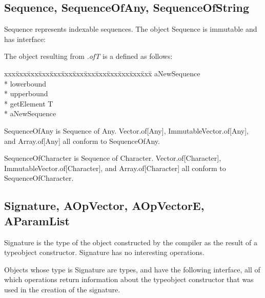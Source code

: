 \subsection{Sequence, SequenceOfAny, SequenceOfString}
Sequence represents indexable sequences.  The object Sequence is immutable
and has interface:
\begin{desc}
  \item[\kw{function} of\/\LB{}T \CO{} \tn{type}\/\RB{} \returns{}
  \/\LB{}aNewSequenceType \CO{} Type\/\RB{} \kw{forall} T]
\end{desc}

\noindent The object resulting from {\it {}.of\/\LB{}T\/\RB{}}
is a  defined as follows:

{\it\begin{minipage}{\textwidth}\begin{tabbing}
xxx\=xxx\=xxx\=xxx\=xxx\=xxx\=xxx\=xxx\=xxx\=xxx\=xxx\=xxx\=xxx\=\+\kill%
 aNewSequence\+\\*{}%
   lowerbound \returns{} \/\LB{}\/\RB{}\\*{}%
   upperbound \returns{} \/\LB{}\/\RB{}\\*{}%
   getElement\/\LB{}\/\RB{} \returns{} \/\LB{}T\/\RB{}\-\\*{}%
 aNewSequence
\end{tabbing}\end{minipage}}

\label{builtin SequenceOfAny}
SequenceOfAny is Sequence of Any.  
Vector.of[Any], ImmutableVector.of[Any], and Array.of[Any]
all conform to SequenceOfAny.

\label{builtin SequenceOfCharacter}
SequenceOfCharacter is Sequence of Character.  
Vector.of[Character], ImmutableVector.of[Character], and Array.of[Character]
all conform to SequenceOfCharacter.

\subsection{Signature, AOpVector, AOpVectorE, AParamList}
\label{builtin Signature}
Signature is the type of the object constructed by the compiler as the
result of a typeobject constructor.  Signature has no interesting operations.

\noindent Objects whose type is Signature are types, and have the
following interface, all of which operations return information about the
typeobject constructor that was used in the creation of the signature.

